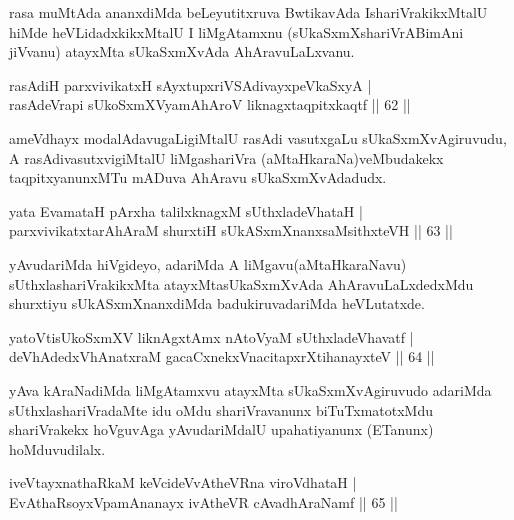 \begin{artha}
rasa muMtAda ananxdiMda beLeyutitxruva BwtikavAda I\break shariVrakikxMtalU hiMde heVLidadxkikxMtalU I liMgAtamxnu (sUkaSxmXshariVrABimAni jiVvanu) atayxMta sUkaSxmXvAda AhAravuLaLxvanu.
\end{artha}


\begin{shl}
rasAdiH parxvivikatxH sAyxtupxriVSAdivayxpeVkaSxyA |\\
rasAdeVrapi sUkoSxmXV\s yamAhAroV liknagxtaqpitxkaqtf \hfill || 62 || 
\end{shl}

\begin{artha}
ameVdhayx modalAdavugaLigiMtalU rasAdi vasutxgaLu sUkaSxmXvAgiruvudu, A rasAdivasutxvigiMtalU liMgashariVra (aMtaHkaraNa)\break veMbudakekx taqpitxyanunxMTu mADuva AhAravu sUkaSxmXvAdadudx.
\end{artha}

\begin{shl}
yata EvamataH pArxha talilxknagxM sUthxladeVhataH |\\
parxvivikatxtarAhAraM shurxtiH sUkASxmXnanxsaMsithxteVH \hfill || 63 || 
\end{shl}

\begin{artha}
yAvudariMda hiVgideyo, adariMda A liMgavu\break (aMtaHkaraNavu) sUthxlashariVrakikxMta atayxMtasUkaSxmXvAda AhAra\-\break vuLaLxdedxMdu shurxtiyu sUkASxmXnanxdiMda badukiruvadariMda heVLutatxde.
\end{artha}

\begin{shl}
yatoV\s tisUkoSxmXV liknAgxtAmx nAtoV\s yaM sUthxladeVhavatf |\\
deVhAdedxVhAnatxraM gacaCxnekxVnacitapxrXtihanayxteV \hfill || 64 || 
\end{shl}

\begin{artha}
yAva kAraNadiMda liMgAtamxvu atayxMta sUkaSxmXvAgiruvudo adariMda sUthxlashariVradaMte idu oMdu shariVravanunx biTuTx\break matotxMdu shariVrakekx hoVguvAga yAvudariMdalU upahatiyanunx (ETanunx) hoMduvudilalx.
\end{artha}


\begin{shl}
iveVtayxnathaRkaM keVcideVvAtheVRna viroVdhataH |\\
EvAthaRsoyxVpamAnanayx ivAtheVR cAvadhAraNamf \hfill || 65 || 
\end{shl}

